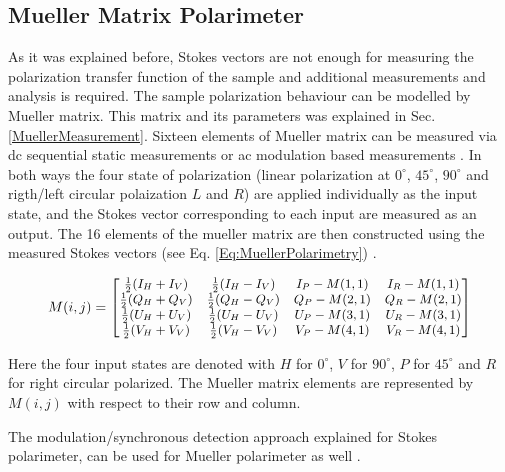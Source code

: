 \documentclass[oneside,a4,12p]{report} %
\begin{document}
	
	\subsection{Mueller Matrix Polarimeter}
	As it was explained before, Stokes vectors are not enough for measuring the polarization transfer function of the sample and additional measurements and analysis is required. The sample polarization behaviour can be modelled by Mueller matrix. This matrix and its parameters was explained in Sec. \ref{MuellerMeasurement}. Sixteen elements of Mueller matrix can be measured via dc sequential static measurements or ac modulation based measurements \cite{ghosh2011tissue}. In both ways the four state of polarization (linear polarization at $0^{\circ}$, $45^{\circ}$, $90^{\circ}$ and rigth/left circular polaization $L$ and $R$) are applied individually as the input state, and the Stokes vector corresponding to each input are measured as an output. The 16 elements of the mueller matrix are then constructed using the measured Stokes vectors (see Eq. \ref{Eq:MuellerPolarimetry}) \cite{ghosh2008mueller}. 
	
	\begin{equation}\label{Eq:MuellerPolarimetry}
	\small
	M(i,j)= 
	\begin{bmatrix}
	\frac{1}{2}(I_{H}+I_{V}) &  \frac{1}{2}(I_{H}-I_{V}) &  I_{P}-M(1,1) &  I_{R}-M(1,1)\\
    \frac{1}{2}(Q_{H}+Q_{V}) &  \frac{1}{2}(Q_{H}-Q_{V}) &  Q_{P}-M(2,1) &  Q_{R}-M(2,1)\\
	\frac{1}{2}(U_{H}+U_{V}) &  \frac{1}{2}(U_{H}-U_{V}) &  U_{P}-M(3,1) &  U_{R}-M(3,1)\\
	\frac{1}{2}(V_{H}+V_{V}) &  \frac{1}{2}(V_{H}-V_{V}) &  V_{P}-M(4,1) &  V_{R}-M(4,1)\\		
	\end{bmatrix} 
	\end{equation}
	
Here the four input states are denoted with $H$ for $0^{\circ}$, $V$ for $ 90^{\circ}$, $P$ for $45^{\circ}$ and $R$ for right circular polarized. The Mueller matrix elements are represented by $M(i,j)$ with respect to their row and column.
	
The modulation/synchronous detection approach explained for Stokes polarimeter, can be used for Mueller polarimeter as well \cite{ghosh2008mueller,ghosh2009mueller}.
\end{document}
